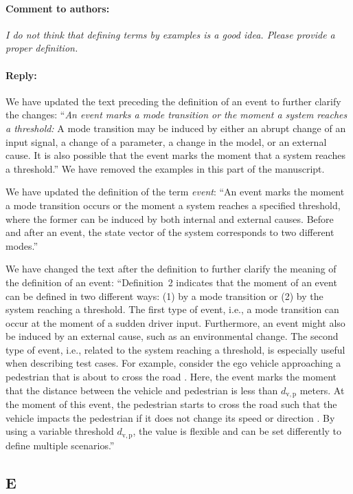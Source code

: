 \documentclass[10pt,final,a4paper,oneside,onecolumn]{article}
\newcommand{\toauthor}{\paragraph*{Comment to authors:} \itshape}
\newcommand{\fromauthor}{\paragraph*{Reply:} \normalfont}
\newcommand{\toauthornew}{\paragraph*{Comment to authors:} \itshape}
\newcommand{\fromauthornew}{\paragraph*{Reply:} \normalfont}
\newcommand{\cstart}{\cbstart\color{red}}
\newcommand{\cend}{\cbend\color{black}}
\newcommand{\distancecondition}{d_{\mathrm{v,p}}}
\begin{document}
\toauthornew I do not think that defining terms by examples is a good idea. Please provide a proper definition.

\fromauthornew We have updated the text preceding the definition of an event to further clarify the changes: ``\emph{An event marks a mode transition or the moment a system reaches a threshold:} A mode transition may be \cstart induced \cend by either an abrupt change of an input signal, a change of a parameter, a change in the model, \cstart or an external cause. \cend It is also possible that the event marks the moment that a system reaches a threshold.'' We have removed the examples in this part of the manuscript.

We have updated the definition of the term \emph{event}: ``An event marks \cstart the moment a mode transition occurs or the moment a system reaches a specified threshold, where the former can be induced by both internal and external causes. \cend Before and after an event, the state vector of the system corresponds to two different modes.''

We have changed the text after the definition to further clarify the meaning of the definition of an event: ``Definition~2 indicates that the moment of an event can be defined in two different ways: \cstart(1) by a mode transition or (2) by the system reaching a threshold. The first type of event, i.e., a mode transition can occur at the moment of a sudden driver input. Furthermore, an event might also be induced by an external cause, such as an environmental change. The second type of event, i.e., related to the system reaching a threshold, \cend is especially useful when describing test cases. For example, consider the ego vehicle approaching a pedestrian that is about to cross the road \autocite{seiniger2015test}. 
Here, the event marks the moment that the distance between the vehicle and pedestrian is less than $\distancecondition$ meters. 
At the moment of this event, the pedestrian starts to cross the road such that the vehicle impacts the pedestrian if it does not change its speed or direction \autocite{seiniger2015test}.
By using a variable threshold $\distancecondition$, the value is flexible and can be set differently to define multiple scenarios.''



\subsection*{E}

%
\end{document}

